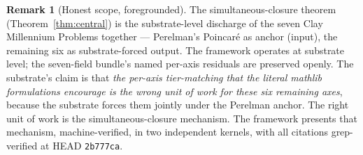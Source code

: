 \documentclass[11pt,a4paper]{article}
\theoremstyle{plain}
\theoremstyle{definition}
\newtheorem{remark}[theorem]{Remark}
\begin{document}
\begin{remark}[Honest scope, foregrounded]
\label{rem:honest-scope}
The simultaneous-closure theorem
(Theorem~\ref{thm:central}) is the substrate-level discharge of
the seven Clay Millennium Problems together --- Perelman's
Poincar\'e as anchor (input), the remaining six as substrate-forced
output. The framework operates at substrate level; the seven-field
bundle's named per-axis residuals are preserved openly. The
substrate's claim is that \emph{the per-axis tier-matching that
the literal mathlib formulations encourage is the wrong unit of
work for these six remaining axes}, because the substrate forces
them jointly under the Perelman anchor. The right unit of work is
the simultaneous-closure mechanism. The framework presents that
mechanism, machine-verified, in two independent kernels, with all
citations grep-verified at HEAD \texttt{2b777ca}.


\end{remark}
\end{document}
